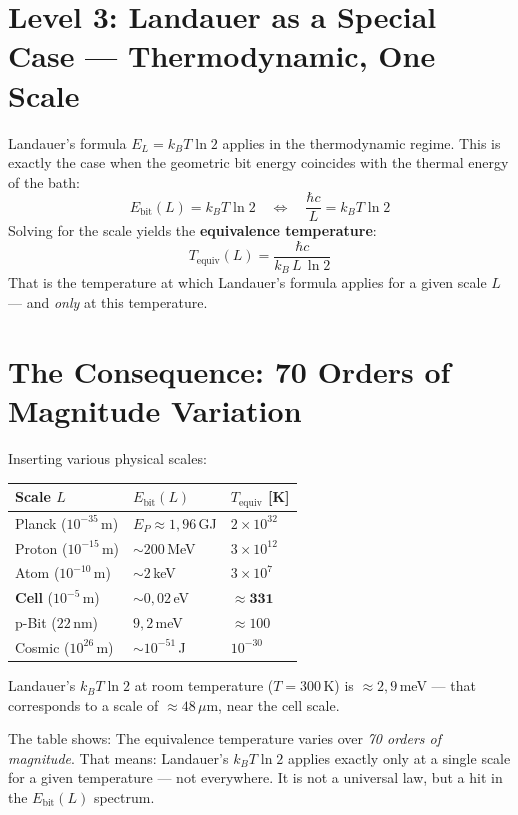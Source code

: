 \section{Level 3: Landauer as a Special Case --- Thermodynamic, One Scale}

Landauer's formula $E_L = k_BT\ln 2$ applies in the thermodynamic regime.
This is exactly the case when the geometric bit energy
coincides with the thermal energy of the bath:
\[
  E_\text{bit}(L) = k_BT\ln 2
  \quad\Longleftrightarrow\quad
  \frac{\hbar c}{L} = k_BT\ln 2
\]
Solving for the scale yields the \textbf{equivalence temperature}:
\[
  T_\text{equiv}(L) = \frac{\hbar c}{k_B \, L \, \ln 2}
\]
That is the temperature at which Landauer's formula applies for a given scale $L$
--- and \emph{only} at this temperature. 

\section{The Consequence: 70 Orders of Magnitude Variation}

Inserting various physical scales:

\begin{center}
\begingroup\small
\begin{tabular}{@{}p{2.5cm}p{2.5cm}p{3.0cm}@{}}
\toprule
Scale $L$ & $E_\text{bit}(L)$ & $T_\text{equiv}$ [K] \\
\midrule
Planck ($10^{-35}$\,m) & $E_P \approx 1{,}96$\,GJ & $2 \times 10^{32}$ \\
Proton ($10^{-15}$\,m) & $\sim 200$\,MeV & $3 \times 10^{12}$ \\
Atom ($10^{-10}$\,m) & $\sim 2$\,keV & $3 \times 10^{7}$ \\
\textbf{Cell} ($10^{-5}$\,m) & $\sim 0{,}02$\,eV & $\mathbf{\approx 331}$ \\
p-Bit ($22$\,nm) & $9{,}2$\,meV & $\approx 100$ \\
Cosmic ($10^{26}$\,m) & $\sim 10^{-51}$\,J & $10^{-30}$ \\
\bottomrule
\end{tabular}
\endgroup
\end{center}

Landauer's $k_BT\ln 2$ at room temperature ($T = 300$\,K) is
${\approx}2{,}9$\,meV --- that corresponds to a scale of ${\approx}48\,\mu$m,
near the cell scale. 

\begin{laierspur}
The table shows: The equivalence temperature varies over \emph{70 orders of magnitude}.
That means: Landauer's $k_BT\ln 2$ applies exactly only at a single scale
for a given temperature --- not everywhere. It is not a universal law,
but a hit in the $E_\text{bit}(L)$ spectrum.
\end{laierspur}

